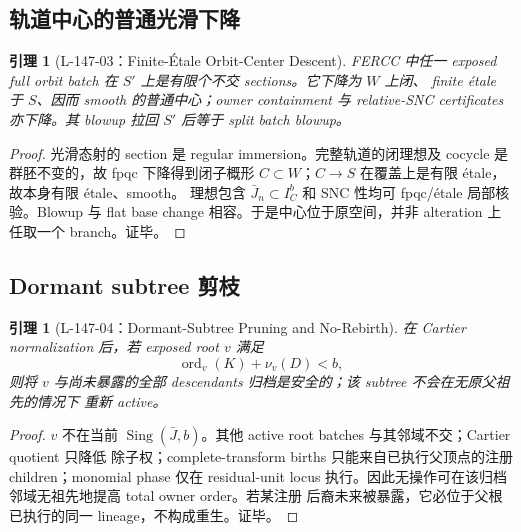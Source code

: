 \documentclass[11pt,a4paper,fontset=fandol]{ctexart}
\newtheorem{lemma}[theorem]{引理}
\newcommand{\Sing}{\operatorname{Sing}}
\newcommand{\ord}{\operatorname{ord}}
\begin{document}
\subsection{轨道中心的普通光滑下降}
\begin{lemma}[L-147-03：Finite-Étale Orbit-Center Descent]
FERCC 中任一 exposed full orbit batch 在 $S'$ 上是有限个不交 sections。它下降为 $W$ 上闭、
finite étale 于 $S$、因而 smooth 的普通中心；owner containment 与 relative-SNC certificates
亦下降。其 blowup 拉回 $S'$ 后等于 split batch blowup。
\end{lemma}
\begin{proof}
光滑态射的 section 是 regular immersion。完整轨道的闭理想及 cocycle 是群胚不变的，故 fpqc
下降得到闭子概形 $C\subset W$；$C\to S$ 在覆盖上是有限 étale，故本身有限 étale、smooth。
理想包含 $\bar J_n\subset I_C^b$ 和 SNC 性均可 fpqc/étale 局部核验。Blowup 与 flat base change
相容。于是中心位于原空间，并非 alteration 上任取一个 branch。证毕。
\end{proof}

\subsection{Dormant subtree 剪枝}
\begin{lemma}[L-147-04：Dormant-Subtree Pruning and No-Rebirth]
在 Cartier normalization 后，若 exposed root $v$ 满足
\[
\ord_v(K)+\nu_v(D)<b,
\]
则将 $v$ 与尚未暴露的全部 descendants 归档是安全的；该 subtree 不会在无原父祖先的情况下
重新 active。
\end{lemma}
\begin{proof}
$v$ 不在当前 $\Sing(\bar J,b)$。其他 active root batches 与其邻域不交；Cartier quotient 只降低
除子权；complete-transform births 只能来自已执行父顶点的注册 children；monomial phase 仅在
residual-unit locus 执行。因此无操作可在该归档邻域无祖先地提高 total owner order。若某注册
后裔未来被暴露，它必位于父根已执行的同一 lineage，不构成重生。证毕。
\end{proof}
\end{document}
